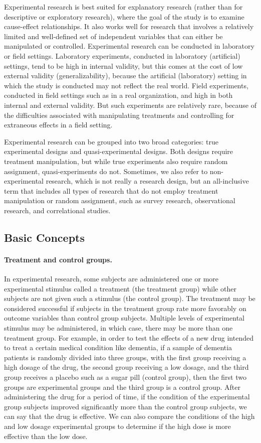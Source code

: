 Experimental research is best suited for explanatory research (rather than for descriptive or exploratory research), where the goal of the study is to examine cause-effect relationships. It also works well for research that involves a relatively limited and well-defined set of independent variables that can either be manipulated or controlled. Experimental research can be conducted in laboratory or field settings. Laboratory experiments, conducted in laboratory (artificial) settings, tend to be high in internal validity, but this comes at the cost of low external validity (generalizability), because the artificial (laboratory) setting in which the study is conducted may not reflect the real world. Field experiments, conducted in field settings such as in a real organization, and high in both internal and external validity. But such experiments are relatively rare, because of the difficulties associated with manipulating treatments and controlling for extraneous effects in a field setting.

Experimental research can be grouped into two broad categories: true experimental designs and quasi-experimental designs. Both designs require treatment manipulation, but while true experiments also require random assignment, quasi-experiments do not. Sometimes, we also refer to non-experimental research, which is not really a research design, but an all-inclusive term that includes all types of research that do not employ treatment manipulation or random assignment, such as survey research, observational research, and correlational studies.

\subsection{Basic Concepts}

\paragraph{Treatment and control groups.} In experimental research, some subjects are administered one or more experimental stimulus called a treatment (the treatment group) while other subjects are not given such a stimulus (the control group). The treatment may be considered successful if subjects in the treatment group rate more favorably on outcome variables than control group subjects. Multiple levels of experimental stimulus may be administered, in which case, there may be more than one treatment group. For example, in order to test the effects of a new drug intended to treat a certain medical condition like dementia, if a sample of dementia patients is randomly divided into three groups, with the first group receiving a high dosage of the drug, the second group receiving a low dosage, and the third group receives a placebo such as a sugar pill (control group), then the first two groups are experimental groups and the third group is a control group. After administering the drug for a period of time, if the condition of the experimental group subjects improved significantly more than the control group subjects, we can say that the drug is effective. We can also compare the conditions of the high and low dosage experimental groups to determine if the high dose is more effective than the low dose.

